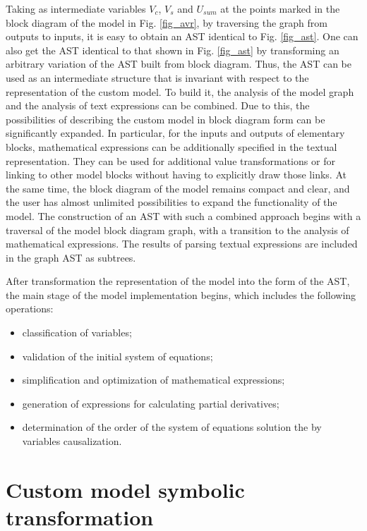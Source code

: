 \documentclass[lettersize,journal]{IEEEtran}
\begin{document}
Taking as intermediate variables \(V_{c}\), \(V_{s}\) and \(U_{sum} \) at the points marked in the block diagram
of the model in Fig. \ref{fig_avr}, by traversing the graph from outputs to inputs, it is easy to obtain an AST 
identical to Fig. \ref{fig_ast}. One can also get the AST identical to that shown in Fig. \ref{fig_ast} by transforming 
an arbitrary variation of the AST built from block diagram. Thus, the AST can be used as an intermediate structure 
that is invariant with respect to the representation of the custom model. To build it, the analysis of the model 
graph and the analysis of text expressions can be combined. Due to this, the possibilities of describing 
the custom model in block diagram form can be significantly expanded. In particular, for the inputs and outputs 
of elementary blocks, mathematical expressions can be additionally specified in the textual representation. 
They can be used for additional value transformations or for linking to other model blocks without having to explicitly draw those links.
At the same time, the block diagram of the model remains compact and clear, and the user has almost unlimited 
possibilities to expand the functionality of the model. The construction of an AST with such a combined approach 
begins with a traversal of the model block diagram graph, with a transition to the analysis of mathematical expressions. The results 
of parsing textual expressions are included in the graph AST as subtrees.

After transformation the representation of the model into the form of the AST, the main stage of the model implementation begins, which includes the following operations:
\begin{itemize}
	\item classification of variables;
	\item validation of the initial system of equations;
	\item simplification and optimization of mathematical expressions;
	\item generation of expressions for calculating partial derivatives;
	\item determination of the order of the system of equations solution the by variables causalization.
\end{itemize}

\section{Custom model symbolic transformation}
\end{document}
